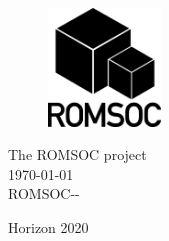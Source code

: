 \documentclass{ROMSOC}
\begin{document}
\thispagestyle{empty}
\begin{center}
\vfill
\begin{figure}
\centering
\vspace{7cm}
  \includegraphics[width=3cm]{./images/ROMSOC_Logo_bw}
\end{figure}
\vfill
{\large The ROMSOC project\\[0.5cm] }
{\large \today \\[0.5cm] }
{\large ROMSOC-\DelNumber-\DelVersion\\[0.5cm] }
\vfill

Horizon 2020

\end{center}
\end{document}
